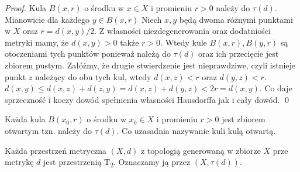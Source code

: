 {\begin{proof}
        Kula $B(x, r)$ o środku w $x\in X$ i promieniu $r>0$ należy do $\tau(d).$ Mianowicie dla każdego $y\in B(x, r)$  Niech $x, y$ będą dwoma różnymi punktami w $X$ oraz $r = d(x, y)/2$. Z własności niezdegenerowania oraz dodatniości metryki mamy, że $d(x, y) >0$ także $r> 0$. Wtedy kule $B(x, r), B(y, r)$ są otoczeniami tych punktów ponieważ należą do $\tau(d)$ oraz ich przecięcie jest zbiorem pustym. Załóżmy, że drugie stwierdzenie jest nieprawdziwe, czyli istnieje punkt $z$ należący do obu tych kul, wtedy $d(x, z) < r$ oraz $d(y, z) < r$. $d(x, y) \leq d(x, z) + d(z, y) = d(x, z) + d(y, z) < 2r = d(x, y).$ Co daje sprzeczność i koczy dowód spełnienia własności Hausdorffa jak i cały dowód. \qed
    \end{proof}
    \begin{thmcoro}
        Każda kula $B(x_0, r)$ o środku w $x_0\in X$ i promieniu $r>0$ jest zbiorem otwartym tzn. należy do $\tau(d).$ Co uzasadnia nazywanie kuli kulą otwartą.
    \end{thmcoro}
    \begin{thmcoro}
        Każda przestrzeń metryczna $(X, d)$ z topologią generowaną w zbiorze $X$ prze metrykę $d$ jest przestrzenią T\textsubscript{2}. Oznaczamy ją przez $(X, \tau(d))$.
    \end{thmcoro}
}